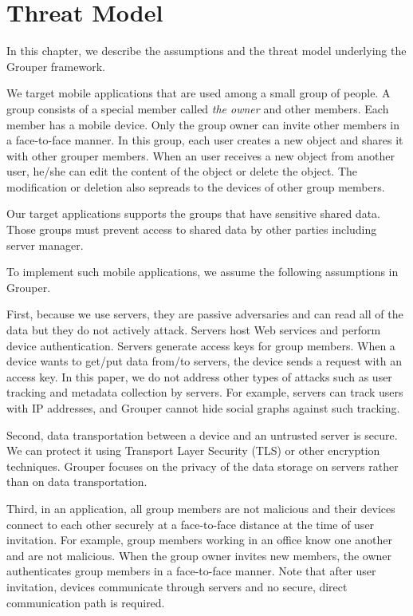 \documentclass[a4paper,11pt]{report}
\begin{document}
\chapter{Threat Model} \label{chapter:threat_model}

In this chapter, we describe the assumptions and the threat model underlying the Grouper framework.

We target mobile applications that are used among a small group of people.
A group consists of a special member called \emph{the owner} and other members.
Each member has a mobile device.
Only the group owner can invite other members in a face-to-face manner.
In this group, each user creates a new object and shares it with other grouper members.
When an user receives a new object from another user, he/she can edit the content of the object or delete the object.
The modification or deletion also sepreads to the devices of other group members.

Our target applications supports the groups that have sensitive shared data.
Those groups must prevent access to shared data by other parties including server manager.

To implement such mobile applications, we assume the following assumptions in Grouper.

First, because we use servers, they are passive adversaries and can read all of the data but they do not actively attack.
Servers host Web services and perform device authentication.
Servers generate access keys for group members. 
When a device wants to get/put data from/to servers, the device sends a request with an access key.
In this paper, we do not address other types of attacks such as user tracking and metadata collection by servers. 
For example, servers can track users with IP addresses, and Grouper cannot hide social graphs against such tracking.

Second, data transportation between a device and an untrusted server is secure.
We can protect it using Transport Layer Security (TLS) or other encryption techniques.
Grouper focuses on the privacy of the data storage on servers rather than on data transportation.

Third, in an application, all group members are not malicious and their devices connect to each other securely at a face-to-face distance at the time of user invitation.
For example, group members working in an office know one another and are not malicious.
When the group owner invites new members, the owner authenticates group members in a face-to-face manner.
Note that after user invitation, devices communicate through servers and no secure, direct communication path is required.
\end{document}
